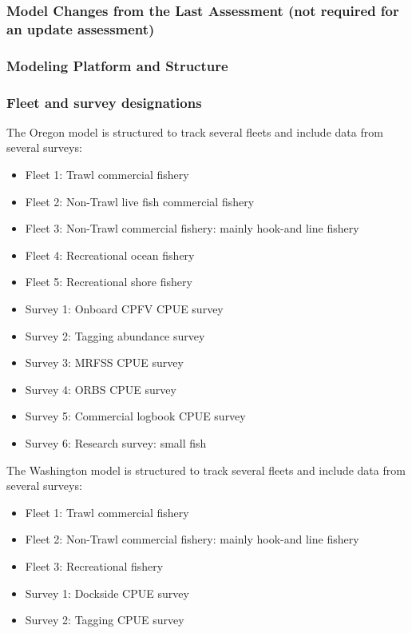 \documentclass[11pt,
  english,
  letterpaper,
]{article}
\providecommand{\tightlist}{%
  \setlength{\itemsep}{0pt}\setlength{\parskip}{0pt}}
\providecommand{\tightlist}{%
  \setlength{\itemsep}{0pt}\setlength{\parskip}{0pt}}
\begin{document}
\hypertarget{model-changes-from-the-last-assessment-not-required-for-an-update-assessment}{%
\subsubsection{Model Changes from the Last Assessment (not required for an update assessment)}\label{model-changes-from-the-last-assessment-not-required-for-an-update-assessment}}

\hypertarget{modeling-platform-and-structure}{%
\subsubsection{Modeling Platform and Structure}\label{modeling-platform-and-structure}}

\hypertarget{fleet-and-survey-designations}{%
\subsubsection{Fleet and survey designations}\label{fleet-and-survey-designations}}

The Oregon model is structured to track several fleets and include data from several surveys:

\begin{itemize}
\tightlist
\item
  Fleet 1: Trawl commercial fishery
\item
  Fleet 2: Non-Trawl live fish commercial fishery
\item
  Fleet 3: Non-Trawl commercial fishery: mainly hook-and line fishery
\item
  Fleet 4: Recreational ocean fishery
\item
  Fleet 5: Recreational shore fishery
\item
  Survey 1: Onboard CPFV CPUE survey
\item
  Survey 2: Tagging abundance survey
\item
  Survey 3: MRFSS CPUE survey
\item
  Survey 4: ORBS CPUE survey
\item
  Survey 5: Commercial logbook CPUE survey
\item
  Survey 6: Research survey: small fish
\end{itemize}

The Washington model is structured to track several fleets and include data from several surveys:

\begin{itemize}
\tightlist
\item
  Fleet 1: Trawl commercial fishery
\item
  Fleet 2: Non-Trawl commercial fishery: mainly hook-and line fishery
\item
  Fleet 3: Recreational fishery
\item
  Survey 1: Dockside CPUE survey
\item
  Survey 2: Tagging CPUE survey
\end{itemize}
\end{document}
